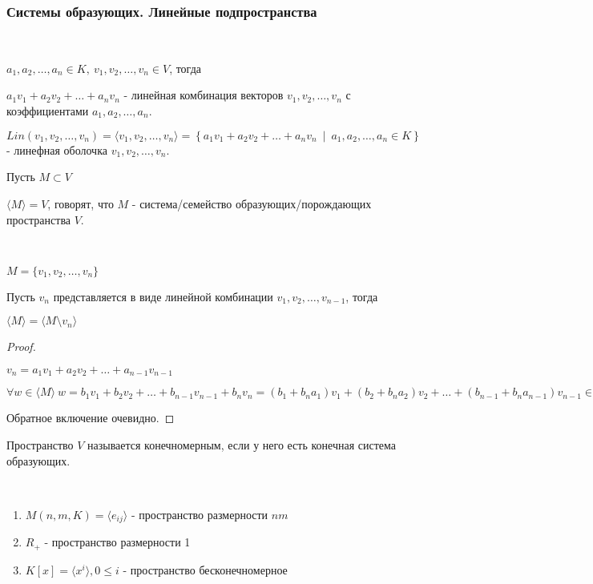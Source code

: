 \subsubsection*{Системы образующих. Линейные подпространства}

\begin{defn}~

    $a_1, a_2, \ldots, a_n \in K, ~ v_1, v_2, \ldots, v_n \in V$, тогда

    $a_1v_1 + a_2v_2 + \ldots + a_nv_n$ - линейная комбинация векторов $v_1, v_2, \ldots, v_n$ с коэффициентами $a_1, a_2, \ldots, a_n$.

    $Lin(v_1, v_2, \ldots, v_n) = \langle v_1, v_2, \ldots, v_n \rangle = \left\{a_1v_1 + a_2v_2 + \ldots + a_nv_n ~ \middle| ~ a_1, a_2, \ldots, a_n \in K\right\}$ - линефная оболочка $v_1, v_2, \ldots, v_n$.

    Пусть $M \subset V$
    
    $\langle M \rangle = V$, говорят, что $M$ - система/семейство образующих/порождающих пространства $V$.
\end{defn}

\begin{theorem-non}~
    
    $M = \{v_1, v_2, \ldots, v_n\}$
    
    Пусть $v_n$ представляется в виде линейной комбинации $v_1, v_2, \ldots, v_{n-1}$, тогда

    $\langle M \rangle = \langle M \setminus v_n \rangle$
\end{theorem-non}

\begin{proof}~

    $v_n = a_1v_1 + a_2v_2 + \ldots + a_{n-1}v_{n-1}$

    $\forall w \in \langle M \rangle~ w = b_1v_1 + b_2v_2 + \ldots + b_{n-1}v_{n-1} + b_nv_n = (b_1 + b_na_1) v_1 + (b_2 + b_na_2) v_2 + \ldots + (b_{n-1} + b_na_{n-1}) v_{n-1} \in \langle M \setminus v_n \rangle$

    Обратное включение очевидно.
\end{proof}

\begin{defn}
    Пространство $V$ называется конечномерным, если у него есть конечная система образующих.
\end{defn}

\begin{example}~

    \begin{enumerate}
        \item $M(n, m, K) = \langle e_{ij} \rangle$ - пространство размерности $nm$
        \item $R_+$ - пространство размерности 1
        \item $K[x] = \langle x^i \rangle, 0 \le i$ - пространство бесконечномерное 
    \end{enumerate}
\end{example}

